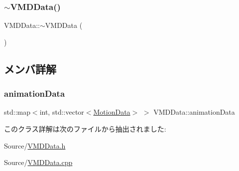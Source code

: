 \subsubsection{\texorpdfstring{$\sim$\+V\+M\+D\+Data()}{~VMDData()}}
{\footnotesize\ttfamily V\+M\+D\+Data\+::$\sim$\+V\+M\+D\+Data (\begin{DoxyParamCaption}{ }\end{DoxyParamCaption})}



\subsection{メンバ詳解}
\mbox{\label{class_v_m_d_data_a539318f7e05cc1af1dd3ca83613494a4}} 
\subsubsection{\texorpdfstring{animation\+Data}{animationData}}
{\footnotesize\ttfamily std\+::map$<$int, std\+::vector$<$\mbox{\hyperlink{struct_motion_data}{Motion\+Data}}$>$ $>$ V\+M\+D\+Data\+::animation\+Data}



このクラス詳解は次のファイルから抽出されました\+:\begin{DoxyCompactItemize}
\item 
Source/\mbox{\hyperlink{_v_m_d_data_8h}{V\+M\+D\+Data.\+h}}\item 
Source/\mbox{\hyperlink{_v_m_d_data_8cpp}{V\+M\+D\+Data.\+cpp}}\end{DoxyCompactItemize}
